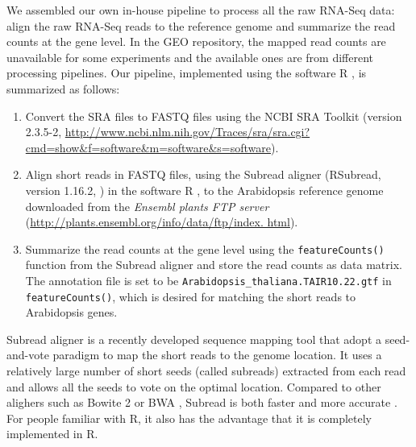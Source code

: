 \documentclass[11pt, a4paper]{article}
\begin{document}
 
We assembled our own in-house pipeline to process all the raw RNA-Seq data:
align the raw RNA-Seq reads to the reference genome and summarize the read counts at the 
gene level. In the GEO repository, the
mapped read counts are unavailable for some experiments and the available ones
are from different processing pipelines.  
Our pipeline, implemented using the software R \citep{Rpackage}, is summarized as follows: 
\begin{enumerate}
    \item Convert the SRA files to FASTQ files using the NCBI SRA Toolkit (version 2.3.5-2,  \url{http://www.ncbi.nlm.nih.gov/Traces/sra/sra.cgi?cmd=show&f=software&m=software&s=software}). 
    \item
	Align short reads in FASTQ files,  using the
	Subread aligner (RSubread, version 1.16.2, \citealt{liao2013subread}) in the software R
	\citep{ Rpackage}, to the Arabidopsis reference genome
	downloaded from the \textit{ Ensembl plants FTP server} (\url{http://plants.ensembl.org/info/data/ftp/index. html}). 
	

 \item
     Summarize the read counts at the gene level using the \verb|featureCounts()| function from the
     Subread aligner
     and store the read counts as data matrix.  
     The annotation file is set to be \verb"Arabidopsis_thaliana.TAIR10.22.gtf" in
     \verb|featureCounts()|, which is desired for matching the short reads to
     Arabidopsis genes. %
\end{enumerate}
Subread aligner is a recently developed sequence mapping tool that adopt a seed-and-vote paradigm to map the short reads to the genome location. It uses a relatively large number of short seeds (called subreads) extracted from each read and allows all the seeds to vote on the optimal location. Compared to other alighers such as Bowite 2 \citep{langmead2012fast} or BWA \citep{li2009fast}, Subread is both faster and more accurate \citep{liao2013subread}. For people familiar with R, it also has the advantage that it is completely implemented in R. 


\end{document}
